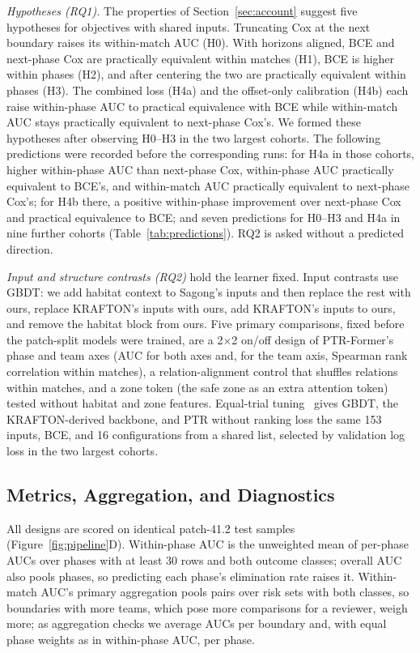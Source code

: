 \documentclass[sigconf,anonymous]{acmart}
\begin{document}
\emph{Hypotheses (RQ1).} The properties of Section~\ref{sec:account} suggest five hypotheses for objectives with shared inputs. Truncating Cox at the next boundary raises its within-match AUC (H0). With horizons aligned, BCE and next-phase Cox are practically equivalent within matches (H1), BCE is higher within phases (H2), and after centering the two are practically equivalent within phases (H3). The combined loss (H4a) and the offset-only calibration (H4b) each raise within-phase AUC to practical equivalence with BCE while within-match AUC stays practically equivalent to next-phase Cox's. We formed these hypotheses after observing H0--H3 in the two largest cohorts. The following predictions were recorded before the corresponding runs: for H4a in those cohorts, higher within-phase AUC than next-phase Cox, within-phase AUC practically equivalent to BCE's, and within-match AUC practically equivalent to next-phase Cox's; for H4b there, a positive within-phase improvement over next-phase Cox and practical equivalence to BCE; and seven predictions for H0--H3 and H4a in nine further cohorts (Table~\ref{tab:predictions}). RQ2 is asked without a predicted direction.

\emph{Input and structure contrasts (RQ2)} hold the learner fixed. Input contrasts use GBDT: we add habitat context to Sagong's inputs and then replace the rest with ours, replace KRAFTON's inputs with ours, add KRAFTON's inputs to ours, and remove the habitat block from ours. Five primary comparisons, fixed before the patch-split models were trained, are a 2$\times$2 on/off design of PTR-Former's phase and team axes (AUC for both axes and, for the team axis, Spearman rank correlation within matches), a relation-alignment control that shuffles relations within matches, and a zone token (the safe zone as an extra attention token) tested without habitat and zone features. Equal-trial tuning~\cite{Bergstra12,Cawley10} gives GBDT, the KRAFTON-derived backbone, and PTR without ranking loss the same 153 inputs, BCE, and 16 configurations from a shared list, selected by validation log loss in the two largest cohorts.

\subsection{Metrics, Aggregation, and Diagnostics}
\label{sec:method:units}
All designs are scored on identical patch-41.2 test samples (Figure~\ref{fig:pipeline}D). Within-phase AUC is the unweighted mean of per-phase AUCs over phases with at least 30 rows and both outcome classes; overall AUC also pools phases, so predicting each phase's elimination rate raises it. Within-match AUC's primary aggregation pools pairs over risk sets with both classes, so boundaries with more teams, which pose more comparisons for a reviewer, weigh more; as aggregation checks we average AUCs per boundary and, with equal phase weights as in within-phase AUC, per phase.
\end{document}

